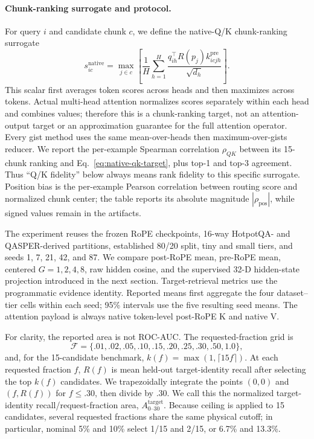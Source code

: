 \documentclass[11pt]{article}
\begin{document}
\paragraph{Chunk-ranking surrogate and protocol.}
For query $i$ and candidate chunk $c$, we define the native-Q/K chunk-ranking surrogate
\begin{equation}
 s^{\mathrm{native}}_{ic}
 =\max_{j\in c}\left[\frac{1}{H}\sum_{h=1}^{H}
 \frac{q_{ih}^{\top}R(p_j)k_{icjh}^{\mathrm{pre}}}{\sqrt{d_h}}\right].
 \label{eq:native-qk-target}
\end{equation}
This scalar first averages token scores across heads and then maximizes across tokens. Actual
multi-head attention normalizes scores separately within each head and combines values;
therefore this is a chunk-ranking target, not an attention-output target or an approximation
guarantee for the full attention operator. Every gist method uses the same mean-over-heads then
maximum-over-gists reducer. We report the per-example Spearman correlation $\rho_{QK}$ between
its 15-chunk ranking and Eq.~\ref{eq:native-qk-target}, plus top-1 and top-3 agreement. Thus
``Q/K fidelity'' below always means rank fidelity to this specific surrogate. Position bias is the per-example
Pearson correlation between routing score and normalized chunk center; the table reports its
absolute magnitude $|\rho_{\mathrm{pos}}|$, while signed values remain in the artifacts.

The experiment reuses the frozen RoPE checkpoints, 16-way HotpotQA- and QASPER-derived
partitions, established 80/20 split, tiny and small tiers, and seeds 1, 7, 21, 42, and 87. We
compare post-RoPE mean, pre-RoPE mean, centered $G=1,2,4,8$, raw hidden
cosine, and the supervised 32-D hidden-state projection introduced in the next section.
Target-retrieval metrics use the programmatic evidence identity. Reported means first aggregate the four
dataset--tier cells within each seed; 95\% intervals use the five resulting seed means.
The attention payload is always native token-level post-RoPE K and native V.

For clarity, the reported area is not ROC-AUC. The requested-fraction grid is
\begin{equation}
\mathcal F=\{.01,.02,.05,.10,.15,.20,.25,.30,.50,1.0\},
\end{equation}
and, for the 15-candidate benchmark, $k(f)=\max(1,\lceil15f\rceil)$. At each requested fraction $f$, $R(f)$ is mean
held-out target-identity recall after selecting the top $k(f)$ candidates. We trapezoidally
integrate the points $(0,0)$ and $(f,R(f))$ for $f\leq.30$, then divide by $.30$. We call this
the normalized target-identity recall/request-fraction area, $A^{\mathrm{target}}_{0\text{--}30}$.
Because ceiling is applied to 15 candidates, several requested fractions share the same
physical cutoff; in particular, nominal 5\% and 10\% select 1/15 and 2/15, or 6.7\% and 13.3\%.
\end{document}
